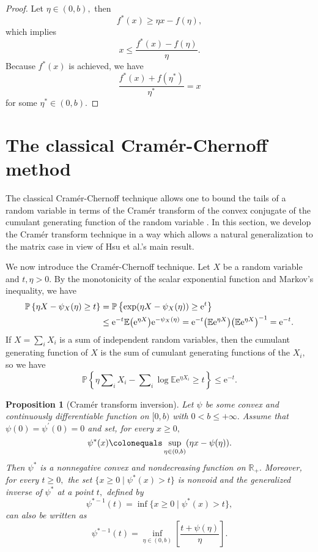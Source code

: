 \documentclass[reqno]{amsart}
\newcommand{\e}{\ensuremath{\mathrm{e}}}
\newcommand{\E}{\ensuremath{\mathbb{E}}}
\newcommand{\Prob}[1]{\ensuremath{\mathbb{P}\left\{#1\right\}}}
\newcommand{\R}{\ensuremath{\mathbb{R}}}
\newtheorem{prop}{Proposition}
\theoremstyle{remark}
\begin{document}
\begin{proof}
Let $\eta \in (0,b),$ then 
\[
f^*(x) \geq \eta x - f(\eta), 
\]
which implies
\[
x \leq \frac{f^*(x) - f(\eta)}{\eta}.
\]
Because $f^*(x)$ is achieved, we have
\[
\frac{f^*(x) + f(\eta^*)}{\eta^*} = x
\]
for some $\eta^* \in (0,b).$
\end{proof}

\section*{The classical Cram\'er-Chernoff method}

The classical Cram\'er-Chernoff technique allows one to bound the tails of a random variable in terms of the Cram\'er transform of the convex conjugate of the cumulant generating function of the random variable \cite{massartconcentration}. In this section, we develop the Cram\'er transform technique in a way which allows a natural generalization to the matrix case in view of Hsu et al.'s main result.

We now introduce the Cram\'er-Chernoff technique. Let $X$ be a random variable and $t,\eta >0.$ By the monotonicity of the scalar exponential function and Markov's inequality, we have
\begin{align}
\Prob{\eta X - \psi_X(\eta) \geq t} & = \Prob{\exp(\eta X - \psi_X(\eta)) \geq \e^t}  \notag \\
& \leq \e^{-t} \E \big( \e^{\eta X}\big) \e^{-\psi_X(\eta)} = \e^{-t} \big(\E \e^{\eta X} \big)\big(\E\e^{\eta X}\big)^{-1} = \e^{-t}. \label{eqn:scalarchernoff}
\end{align}
If $X = \sum_i X_i$ is a sum of independent random variables, then the cumulant generating function of $X$ is the sum of cumulant generating functions of the $X_i,$ so we have
\begin{equation}
\Prob{\eta \sum\nolimits_i X_i - \sum\nolimits_i \log \E \e^{\eta X_i} \geq t} \leq \e^{-t}. \label{eqn:scalarsumchernoff}
\end{equation}

\begin{prop}[Cram\'er transform inversion]
Let $\psi$ be some convex and continuously differentiable function on $[0,b)$ with $0 < b \leq +\infty.$ Assume that $\psi(0)=\psi^\prime(0)=0$ and set, for every $x \geq 0,$
\[
\psi^*(x) \colonequals \sup_{\eta \in (0,b)} (\eta x - \psi(\eta)).
\]
Then $\psi^*$ is a nonnegative convex and nondecreasing function on $\R_+.$ Moreover, for every $t \geq 0,$ the set $\{x \geq 0\mid \psi^*(x) > t \}$ is nonvoid and the generalized inverse of $\psi^*$ at a point $t,$ defined by
\[
\psi^{*-1}(t) = \inf \{ x \geq 0 \mid \psi^*(x) > t \},
\]
can also be written as
\[
\psi^{*-1}(t) = \inf_{\eta \in (0,b)} \left[ \frac{t + \psi(\eta)}{\eta} \right].
\]
\label{prop:cramertransforminversion}
\end{prop}
\end{document}
